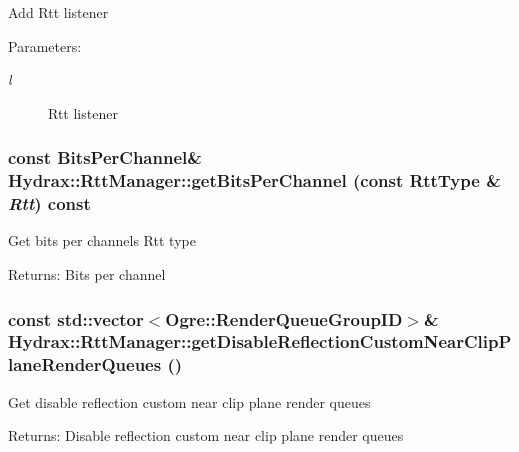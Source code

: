 \begin{CompactItemize}
Add Rtt listener \begin{Desc}
\item[Parameters:]
\begin{description}
\item[{\em l}]Rtt listener \end{description}
\end{Desc}
\hypertarget{class_hydrax_1_1_rtt_manager_a0834735c92a9f72f34eaee8e6478343}{
\subsubsection[{getBitsPerChannel}]{\setlength{\rightskip}{0pt plus 5cm}const {\bf BitsPerChannel}\& Hydrax::RttManager::getBitsPerChannel (const {\bf RttType} \& {\em Rtt}) const}}
\label{class_hydrax_1_1_rtt_manager_a0834735c92a9f72f34eaee8e6478343}


Get bits per channels  Rtt type \begin{Desc}
\item[Returns:]Bits per channel \end{Desc}
\hypertarget{class_hydrax_1_1_rtt_manager_8f851b42bccd3653458dad169b6fcff9}{
\subsubsection[{getDisableReflectionCustomNearClipPlaneRenderQueues}]{\setlength{\rightskip}{0pt plus 5cm}const std::vector$<$Ogre::RenderQueueGroupID$>$\& Hydrax::RttManager::getDisableReflectionCustomNearClipPlaneRenderQueues ()}}
\label{class_hydrax_1_1_rtt_manager_8f851b42bccd3653458dad169b6fcff9}


Get disable reflection custom near clip plane render queues \begin{Desc}
\item[Returns:]Disable reflection custom near clip plane render queues \end{Desc}
\hypertarget{class_hydrax_1_1_rtt_manager_88b7c387e413cf219f399926c2dbea7e}{
}
\end{CompactItemize}
